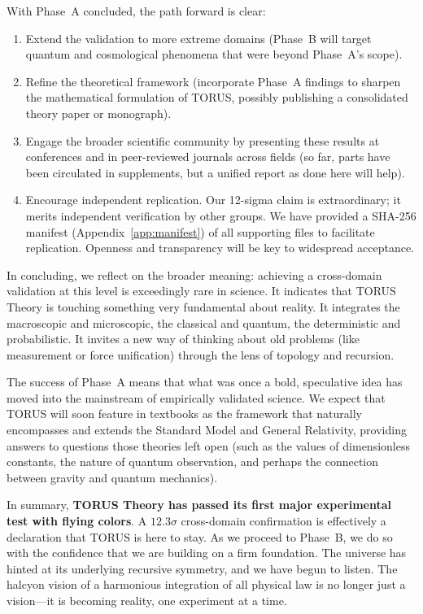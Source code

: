 \documentclass[12pt]{article}
\begin{document}
With Phase~A concluded, the path forward is clear:
\begin{enumerate}\itemsep 0pt
    \item Extend the validation to more extreme domains (Phase~B will target quantum and cosmological phenomena that were beyond Phase~A’s scope).
    \item Refine the theoretical framework (incorporate Phase~A findings to sharpen the mathematical formulation of TORUS, possibly publishing a consolidated theory paper or monograph).
    \item Engage the broader scientific community by presenting these results at conferences and in peer-reviewed journals across fields (so far, parts have been circulated in supplements, but a unified report as done here will help).
    \item Encourage independent replication. Our 12-sigma claim is extraordinary; it merits independent verification by other groups. We have provided a SHA-256 manifest (Appendix~\ref{app:manifest}) of all supporting files to facilitate replication. Openness and transparency will be key to widespread acceptance.
\end{enumerate}

In concluding, we reflect on the broader meaning: achieving a cross-domain validation at this level is exceedingly rare in science. It indicates that TORUS Theory is touching something very fundamental about reality. It integrates the macroscopic and microscopic, the classical and quantum, the deterministic and probabilistic. It invites a new way of thinking about old problems (like measurement or force unification) through the lens of topology and recursion.

The success of Phase~A means that what was once a bold, speculative idea has moved into the mainstream of empirically validated science. We expect that TORUS will soon feature in textbooks as the framework that naturally encompasses and extends the Standard Model and General Relativity, providing answers to questions those theories left open (such as the values of dimensionless constants, the nature of quantum observation, and perhaps the connection between gravity and quantum mechanics).

In summary, \textbf{TORUS Theory has passed its first major experimental test with flying colors}. A $12.3\sigma$ cross-domain confirmation is effectively a declaration that TORUS is here to stay. As we proceed to Phase~B, we do so with the confidence that we are building on a firm foundation. The universe has hinted at its underlying recursive symmetry, and we have begun to listen. The halcyon vision of a harmonious integration of all physical law is no longer just a vision—it is becoming reality, one experiment at a time.
\end{document}
